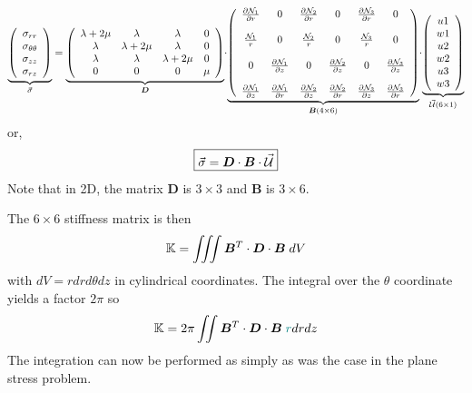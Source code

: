 \[
\underbrace{
\left(
\begin{array}{c}
\sigma_{rr} \\
\sigma_{\theta\theta} \\
\sigma_{zz} \\
\sigma_{rz} 
\end{array}
\right)
}_{\vec{\sigma}}
=
\underbrace{
\left(
\begin{array}{cccc}
\lambda+2\mu & \lambda & \lambda & 0  \\
\lambda & \lambda+2\mu & \lambda & 0  \\
\lambda & \lambda & \lambda+2\mu & 0  \\
0 & 0 & 0 & \mu 
\end{array}
\right)
}_{\bm D}
\!
\cdot
\!
\underbrace{
\left(
\begin{array}{ccccccccc}
\frac{\partial {\mathcal{N}}_1}{\partial r} &  0 &  
\frac{\partial {\mathcal{N}}_2}{\partial r} &  0 &
\frac{\partial {\mathcal{N}}_3}{\partial r} &  0 \\  \\
\frac{{\mathcal{N}}_1}{r}  & 0 &  
\frac{{\mathcal{N}}_2}{r}  & 0 &
\frac{{\mathcal{N}}_3}{r}  & 0 \\  \\
 0 & \frac{\partial {\mathcal{N}}_1}{\partial z}  &
 0 & \frac{\partial {\mathcal{N}}_2}{\partial z}  &
 0 & \frac{\partial {\mathcal{N}}_3}{\partial z}  \\ \\
\frac{\partial {\mathcal{N}}_1}{\partial z} & \frac{\partial {\mathcal{N}}_1}{\partial r}  &
\frac{\partial {\mathcal{N}}_2}{\partial z} & \frac{\partial {\mathcal{N}}_2}{\partial r}  &
\frac{\partial {\mathcal{N}}_3}{\partial z} & \frac{\partial {\mathcal{N}}_3}{\partial r}   
\end{array}
\right)
}_{\bm B (4\times 6) }
\!
\cdot
\!
\underbrace{
\left(
\begin{array}{c}
u1 \\  w1 \\ u2 \\  w2 \\ u3 \\ w3 
\end{array}
\right)
}_{\vec {\cal U} (6\times1)}
\]
or, 
\[
\boxed{
\vec\sigma = {\bm D} \cdot {\bm B} \cdot \vec{\cal U}
}
\]
Note that in 2D, the matrix ${\bm D}$ is $3\times3$ and 
${\bm B}$ is $3\times 6$.


\noindent The $6\times 6$ stiffness matrix is then 
\[
{\mathbb{K}} = \iiint {\bm B}^T \cdot {\bm D} \cdot {\bm B}\; dV
\]
with $dV= r dr d\theta dz$ in cylindrical coordinates. The integral 
over the $\theta$ coordinate yields a factor $2\pi$ so 
\[
{\mathbb{K}} = 2 \pi \iint {\bm B}^T \cdot {\bm D} \cdot {\bm B}\; {\color{teal} r} drdz
\]
The integration can now be performed as simply as was the case in the plane stress problem.

